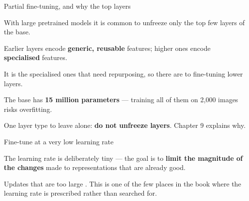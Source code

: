\documentclass[aspectratio=169,11pt,t]{beamer}
\begin{document}
\begin{frame}[shrink=25]{Partial fine-tuning, and why the top layers}
{\fontsize{9.4}{12.6}\selectfont\color{fg2}With large pretrained models it is common to unfreeze only the top few layers of the base.\par}\vskip 4pt
\begin{minipage}[t]{0.485\textwidth}
\begin{ibullets}
\item Earlier layers encode \textbf{generic, reusable} features; higher ones encode \textbf{specialised} features.
\item It is the specialised ones that need repurposing, so there are  to fine-tuning lower layers.
\item The base has \textbf{15 million parameters} --- training all of them on 2,000 images risks overfitting.
\end{ibullets}

\end{minipage}%
\hfill
\begin{minipage}[t]{0.485\textwidth}

\end{minipage}%
\begin{iband}[amber]
One layer type to leave alone: \textbf{do not unfreeze  layers}. Chapter 9 explains why.
\end{iband}
\end{frame}

\begin{frame}[shrink=25]{Fine-tune at a very low learning rate}
{\fontsize{9.4}{12.6}\selectfont\color{fg2}The learning rate is deliberately tiny --- the goal is to \textbf{limit the magnitude of the changes} made to representations that are already good.\par}\vskip 4pt
\begin{iband}[signal]
Updates that are too large . This is one of the few places in the book where the learning rate is prescribed rather than searched for.
\end{iband}
\end{frame}
\end{document}
